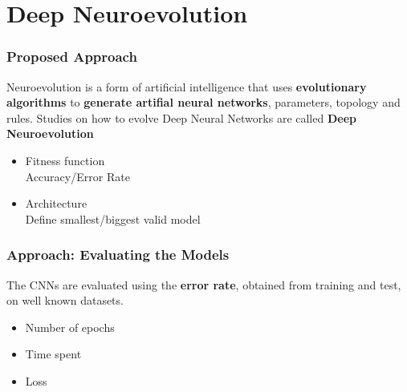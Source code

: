 \documentclass[aspectratio=169]{beamer}
\begin{document}
	\section{Deep Neuroevolution}
		\begin{frame}
			\frametitle{Proposed Approach}
			
			\begin{block}{}
				Neuroevolution is a form of artificial intelligence that uses \textbf{evolutionary algorithms} to \textbf{generate artifial neural networks}, parameters, topology and rules. Studies on how to evolve Deep Neural Networks are called \textbf{Deep Neuroevolution}
			\end{block}
			
			\begin{itemize}
				\item Fitness function\\
				\textcolor{ExecusharesGrey}{\small\hspace{1em}Accuracy/Error Rate}
				\item Architecture\\
				\textcolor{ExecusharesGrey}{\small\hspace{1em}Define smallest/biggest valid model}
			\end{itemize}
		\end{frame}
		\begin{frame}
			\frametitle{Approach: Evaluating the Models}
			
			\begin{block}{}
				The CNNs are evaluated using the \textbf{error rate}, obtained from training and test, on well known datasets.
			\end{block}
			
			\begin{itemize}
				\item Number of epochs
				\item Time spent
				\item Loss
			\end{itemize}
			
		\end{frame}
\end{document}

